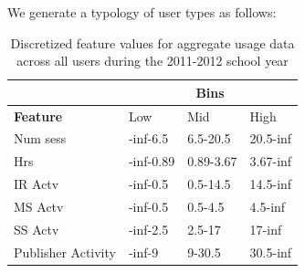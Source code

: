 \documentclass{acm_proc_article-sp}
\begin{document}
We generate a typology of user types as follows:

\begin{table}
\caption{Discretized feature values for aggregate usage data across all users during the 2011-2012 school year}
\label{aggfeaturebins}
\begin{tabular}{|p{3.5cm}|l|l|l|} 
\hline
& \multicolumn{3}{c|}{\textbf{Bins}}  \\ \hline
\textbf{Feature} & Low & Mid & High \\ \hline
Num sess & -inf-6.5 & 6.5-20.5 & 20.5-inf \\ \hline
Hrs & -inf-0.89 &0.89-3.67 & 3.67-inf \\ \hline
IR Actv & -inf-0.5 & 0.5-14.5 & 14.5-inf \\ \hline
MS Actv & -inf-0.5 & 0.5-4.5 & 4.5-inf \\ \hline
SS Actv & -inf-2.5 & 2.5-17 & 17-inf \\ \hline
Publisher Activity & -inf-9 & 9-30.5 & 30.5-inf \\ \hline
\end{tabular}
\end{table}
\end{document}
